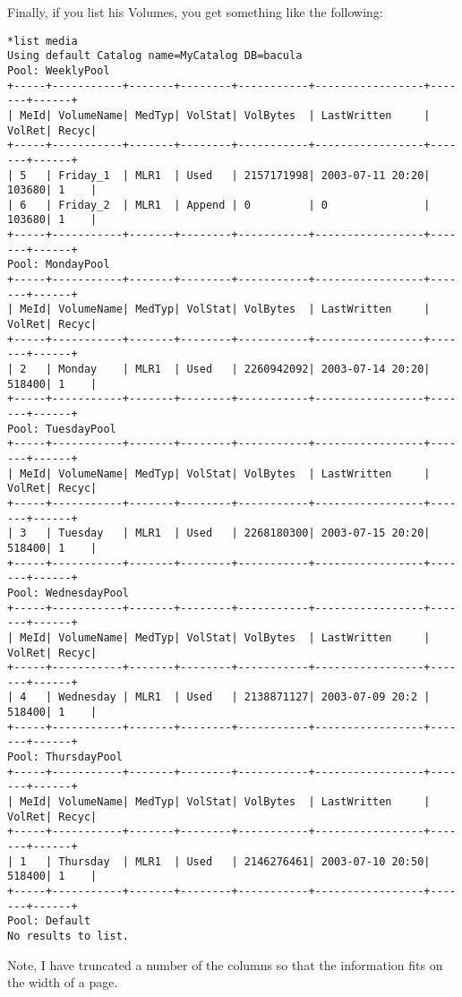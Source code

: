 Finally, if you list his Volumes, you get something like the following: 

\footnotesize
\begin{verbatim}
*list media
Using default Catalog name=MyCatalog DB=bacula
Pool: WeeklyPool
+-----+-----------+-------+--------+-----------+-----------------+-------+------+
| MeId| VolumeName| MedTyp| VolStat| VolBytes  | LastWritten     | VolRet| Recyc|
+-----+-----------+-------+--------+-----------+-----------------+-------+------+
| 5   | Friday_1  | MLR1  | Used   | 2157171998| 2003-07-11 20:20| 103680| 1    |
| 6   | Friday_2  | MLR1  | Append | 0         | 0               | 103680| 1    |
+-----+-----------+-------+--------+-----------+-----------------+-------+------+
Pool: MondayPool
+-----+-----------+-------+--------+-----------+-----------------+-------+------+
| MeId| VolumeName| MedTyp| VolStat| VolBytes  | LastWritten     | VolRet| Recyc|
+-----+-----------+-------+--------+-----------+-----------------+-------+------+
| 2   | Monday    | MLR1  | Used   | 2260942092| 2003-07-14 20:20| 518400| 1    |
+-----+-----------+-------+--------+-----------+-----------------+-------+------+
Pool: TuesdayPool
+-----+-----------+-------+--------+-----------+-----------------+-------+------+
| MeId| VolumeName| MedTyp| VolStat| VolBytes  | LastWritten     | VolRet| Recyc|
+-----+-----------+-------+--------+-----------+-----------------+-------+------+
| 3   | Tuesday   | MLR1  | Used   | 2268180300| 2003-07-15 20:20| 518400| 1    |
+-----+-----------+-------+--------+-----------+-----------------+-------+------+
Pool: WednesdayPool
+-----+-----------+-------+--------+-----------+-----------------+-------+------+
| MeId| VolumeName| MedTyp| VolStat| VolBytes  | LastWritten     | VolRet| Recyc|
+-----+-----------+-------+--------+-----------+-----------------+-------+------+
| 4   | Wednesday | MLR1  | Used   | 2138871127| 2003-07-09 20:2 | 518400| 1    |
+-----+-----------+-------+--------+-----------+-----------------+-------+------+
Pool: ThursdayPool
+-----+-----------+-------+--------+-----------+-----------------+-------+------+
| MeId| VolumeName| MedTyp| VolStat| VolBytes  | LastWritten     | VolRet| Recyc|
+-----+-----------+-------+--------+-----------+-----------------+-------+------+
| 1   | Thursday  | MLR1  | Used   | 2146276461| 2003-07-10 20:50| 518400| 1    |
+-----+-----------+-------+--------+-----------+-----------------+-------+------+
Pool: Default
No results to list.
\end{verbatim}
\normalsize

Note, I have truncated a number of the columns so that the information fits on
the width of a page. 
